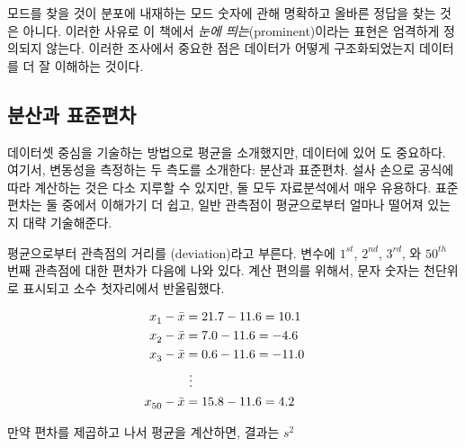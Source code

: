 \begin{tipBox}{
모드를 찾을 것이 분포에 내재하는 모드 숫자에 관해 명확하고 올바른 정답을 찾는 것은 아니다.
이러한 사유로 이 책에서 \emph{눈에 띄는}(prominent)이라는 표현은 엄격하게 정의되지 않는다.
이러한 조사에서 중요한 점은 데이터가 어떻게 구조화되었는지 데이터를 더 잘 이해하는 것이다. }
\end{tipBox}


\subsection{분산과 표준편차}
\label{variability}

데이터셋 중심을 기술하는 방법으로 평균을 소개했지만, 데이터에 있어 도 중요하다.
여기서, 변동성을 측정하는 두 측도를 소개한다: 분산과 표준편차.
설사 손으로 공식에 따라 계산하는 것은 다소 지루할 수 있지만, 둘 모두 자료분석에서 매우 유용하다.
표준편차는 둘 중에서 이해가기 더 쉽고, 일반 관측점이 평균으로부터 얼마나 떨어져 있는지 대략 기술해준다.

평균으로부터 관측점의 거리를 (deviation)라고 부른다.
 변수에 $1^{st}_{}$, $2^{nd}_{}$, $3^{rd}$, 와 $50^{th}_{}$ 번째 관측점에 대한 편차가 다음에 나와 있다.
계산 편의를 위해서, 문자 숫자는 천단위로 표시되고 소수 첫자리에서 반올림했다.

\begin{align*}
x_1^{}-\bar{x} &= 21.7 - 11.6 = 10.1 \hspace{5mm}\text{ } \\
x_2^{}-\bar{x} &= 7.0 - 11.6 = -4.6 \\
x_3^{}-\bar{x} &= 0.6 - 11.6 = -11.0 \\
			&\ \vdots \\
x_{50}^{}-\bar{x} &= 15.8 - 11.6 = 4.2
\end{align*}

만약 편차를 제곱하고 나서 평균을 계산하면, 결과는 $s_{}^2$

